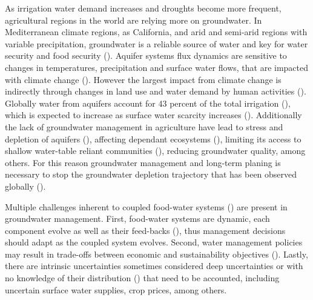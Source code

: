 \documentclass[11pt,a4paper]{article}
\begin{document}
As irrigation water demand increases and droughts become more frequent, agricultural regions in the world are relying more on groundwater. In Mediterranean climate regions, as California, and arid and semi-arid regions with variable precipitation, groundwater is a reliable source of water and key for water security and food security (\cite{priyan_issues_2021,malmgren_groundwater_2022}). Aquifer systems flux dynamics are sensitive to changes in temperatures, precipitation and surface water flows, that are impacted with climate change (\cite{wu_divergent_2020,cuthbert_global_2019}). However the largest impact from climate change is indirectly through changes in land use and water demand by human activities (\cite{taylor_ground_2013}). Globally water from aquifers account for 43 percent of the total irrigation (\cite{siebert_groundwater_2010}), which is expected to increase as surface water scarcity increases (\cite{wada_nonsustainable_2012}). Additionally the lack of groundwater management in agriculture have lead to stress and depletion of aquifers (\cite{dalin_groundwater_2017, wada_global_2010}), affecting dependant ecosystems (\cite{bierkens_non-renewable_2019}), limiting its access to shallow water-table reliant communities (\cite{perrone_dry_2017,pauloo_domestic_2020}), reducing groundwater quality, among others. For this reason groundwater management and long-term planing is necessary to stop the groundwater depletion trajectory that has been observed globally (\cite{gorelick_global_2015}).

Multiple challenges inherent to coupled food-water systems (\cite{polhill_modelling_2016}) are present in groundwater management. First, food-water systems are dynamic, each component evolve as well as their feed-backs (\cite{filatova_regime_2016}), thus management decisions should adapt as the coupled system evolves. Second, water management policies may result in trade-offs between economic and sustainability objectives (\cite{mcdermid_minimizing_2021,torhan_tradeoffs_2022,young_hydrologic-economic_2021,stone_economic_2022}). Lastly, there are intrinsic uncertainties sometimes considered deep uncertainties or with no knowledge of their distribution (\cite{stirling_keep_2010}) that need to be accounted, including uncertain surface water supplies, crop prices, among others.  
\end{document}
